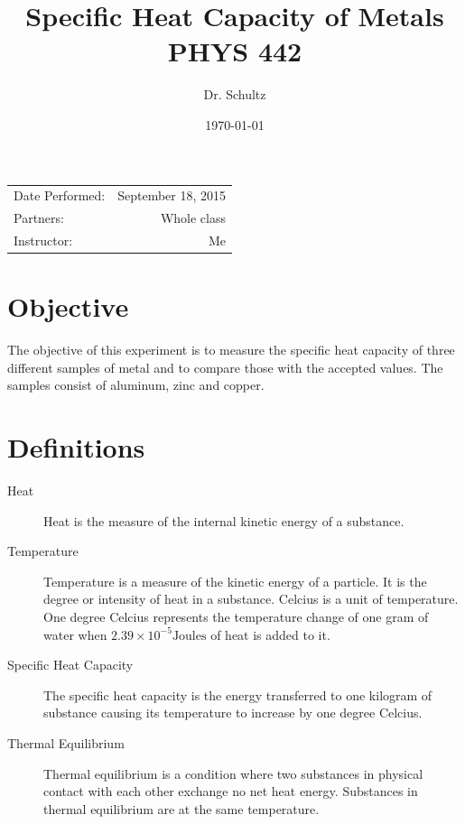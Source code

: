 \documentclass{article}
\title{Specific Heat Capacity of Metals \\ PHYS 442} %
\author{Dr. Schultz } %
\date{\today} %
\begin{document}
\maketitle %

\begin{center}
\begin{tabular}{l r}
Date Performed: & September 18, 2015 \\ %
Partners: & Whole class \\ %
Instructor: & Me %
\end{tabular}
\end{center}



\section{Objective}

The objective of this experiment is to measure the specific heat capacity of three different samples of metal and to compare those with the accepted values.  The samples consist of aluminum, zinc and copper.

\section{Definitions}
\label{definitions}
\begin{description}
\item[Heat]
Heat is the measure of the internal kinetic energy of a substance.
\item[Temperature]
Temperature is a measure of the kinetic energy of a particle.  It is the degree or intensity of heat in a substance.  Celcius is a unit of temperature.  One degree Celcius represents the temperature change of one gram of water when $2.39\times10^{-5}\text{Joules}$ of heat is added to it.

\item[Specific Heat Capacity]
The specific heat capacity is the energy transferred to one kilogram of substance causing its temperature to increase by one degree Celcius.\cite{Homer:2014}

\item[Thermal Equilibrium]
Thermal equilibrium is a condition where two substances in physical contact with each other exchange no net heat energy.  Substances in thermal equilibrium are at the same temperature.
\end{description}
\end{document}
